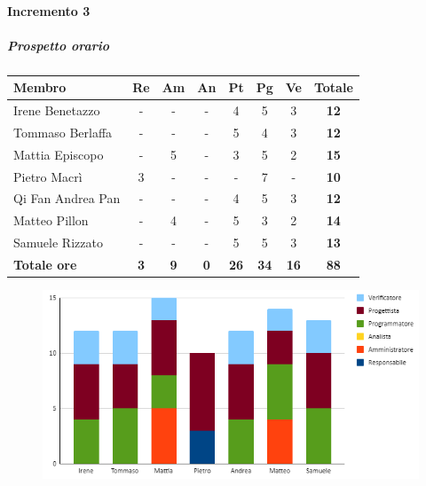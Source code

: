 \paragraph{Incremento 3}
\subparagraph{Prospetto orario}
\begin{center}
	\renewcommand{\arraystretch}{1.8} %
	\begin{tabular}{ |m{10em}|c|c|c|c|c|c|c| }
	\hline
	\textbf{Membro} & \textbf{Re} & \textbf{Am} &  \textbf{An} &  \textbf{Pt} &  \textbf{Pg} &  \textbf{Ve} &  \textbf{Totale}\\
    \hline
    Irene Benetazzo   & - & - & - & 4 & 5 & 3 & \textbf{12} \\
    \hline
    Tommaso Berlaffa  & - & - & - & 5 & 4 & 3 & \textbf{12} \\
    \hline
    Mattia Episcopo   & - & 5 & - & 3 & 5 & 2 & \textbf{15} \\
    \hline
    Pietro Macrì      & 3 & - & - & - & 7 & - & \textbf{10} \\
    \hline
    Qi Fan Andrea Pan & - & - & - & 4 & 5 & 3 & \textbf{12} \\
    \hline
    Matteo Pillon     & - & 4 & - & 5 & 3 & 2 & \textbf{14} \\
    \hline
    Samuele Rizzato   & - & - & - & 5 & 5 & 3 & \textbf{13} \\
    \hline
    \textbf{Totale ore} & \textbf{3} & \textbf{9} &  \textbf{0} &  \textbf{26} &  \textbf{34} &  \textbf{16} &  \textbf{88}\\
    \hline
	\end{tabular}
\end{center}
\begin{figure}[H]
   \centering\includegraphics{images/preventivo/PB-incremento3-ore.png}
\end{figure}


